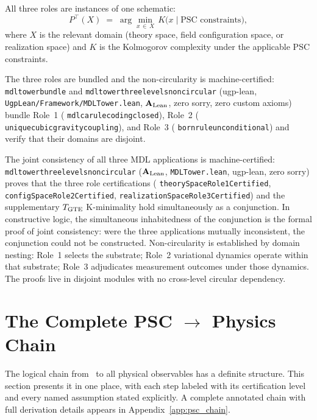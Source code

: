 \documentclass[11pt,openany]{book}
\theoremstyle{remark}
\newcommand{\PSC}{\text{PSC}}
\newcommand{\lean}[1]{%
  \penalty-100
  \begingroup\def\_{\textunderscore\allowbreak}\texttt{#1}\endgroup}
\newcommand{\CatAL}{\ensuremath{\textbf{A}_{\rm Lean}}}
\begin{document}
All three roles are instances of one schematic:
\begin{equation}
  P^\top(X) \;=\; \arg\min_{x \,\in\, X}\, K\!\bigl(x \mid \text{PSC constraints}\bigr),
\end{equation}
where $X$ is the relevant domain (theory space, field configuration space, or
realization space) and $K$ is the Kolmogorov complexity under the applicable PSC
constraints.

The three roles are bundled and the non-circularity is machine-certified:
\lean{mdl\_tower\_bundle} and \lean{mdl\_tower\_three\_levels\_non\_circular}
(ugp-lean, \texttt{UgpLean/Framework/MDLTower.lean}, \CatAL, zero sorry,
zero custom axioms) bundle Role~1 (\lean{mdl\_ca\_rule\_coding\_closed}), Role~2
(\lean{unique\_cubic\_gravity\_coupling}), and Role~3 (\lean{born\_rule\_unconditional})
and verify that their domains are disjoint.

The joint consistency of all three MDL applications is machine-certified:
\lean{mdl\_tower\_three\_levels\_non\_circular} (\CatAL, \texttt{MDLTower.lean}, ugp-lean,
zero sorry) proves that the three role certifications
(\lean{theorySpaceRole1Certified}, \lean{configSpaceRole2Certified},
\lean{realizationSpaceRole3Certified}) and the supplementary $T_{\rm GTE}$
K-minimality hold simultaneously as a conjunction.
In constructive logic, the simultaneous inhabitedness of the conjunction is the formal
proof of joint consistency: were the three applications mutually inconsistent, the
conjunction could not be constructed.
Non-circularity is established by domain nesting: Role~1 selects the substrate; Role~2
variational dynamics operate within that substrate; Role~3 adjudicates measurement
outcomes under those dynamics. The proofs live in disjoint modules with no cross-level
circular dependency.

\FloatBarrier

\section{The Complete PSC $\to$ Physics Chain}
\label{sec:psc_chain}

The logical chain from \PSC\ to all physical observables has a definite structure.
This section presents it in one place, with each step labeled with its certification
level and every named assumption stated explicitly. A complete annotated chain with
full derivation details appears in Appendix~\ref{app:psc_chain}.
\end{document}
